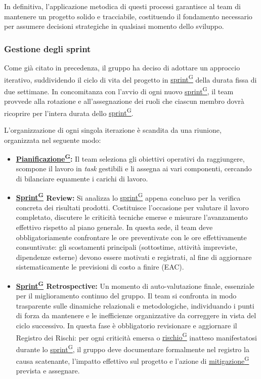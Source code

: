 \documentclass[a4paper,12pt]{article}
\providecommand{\glslink}[2]{\href{https://alittlebyte-19.github.io/Documentazione/glossario.html\#gls-#1}{\underline{#2}\textsuperscript{\scriptsize G}}}
\begin{document}
In definitiva, l'applicazione metodica di questi processi garantisce al team di mantenere un progetto solido e tracciabile, costituendo il fondamento necessario per assumere decisioni strategiche in qualsiasi momento dello sviluppo.

\subsubsection{Gestione degli sprint}

Come già citato in precedenza, il gruppo ha deciso di adottare un approccio iterativo, suddividendo il ciclo di vita del progetto in \glslink{sprint}{sprint} della durata fissa di due settimane. In concomitanza con l'avvio di ogni nuovo \glslink{sprint}{sprint}, il team provvede alla rotazione e all'assegnazione dei ruoli che ciascun membro dovrà ricoprire per l'intera durata dello \glslink{sprint}{sprint}.

L'organizzazione di ogni singola iterazione è scandita da una riunione, organizzata nel seguente modo:

\begin{itemize}
    \item \textbf{\glslink{pianificazione}{Pianificazione}:} Il team seleziona gli obiettivi operativi da raggiungere, scompone il lavoro in \textit{task} gestibili e li assegna ai vari componenti, cercando di bilanciare equamente i carichi di lavoro.
    \item \textbf{\glslink{sprint}{Sprint} Review:} Si analizza lo \glslink{sprint}{sprint} appena concluso per la verifica concreta dei risultati prodotti. Costituisce l'occasione per valutare il lavoro completato, discutere le criticità tecniche emerse e misurare l'avanzamento effettivo rispetto al piano generale. In questa sede, il team deve obbligatoriamente confrontare le ore preventivate con le ore effettivamente consuntivate: gli scostamenti principali (sottostime, attività impreviste, dipendenze esterne) devono essere motivati e registrati, al fine di aggiornare sistematicamente le previsioni di costo a finire (EAC).
    \item \textbf{\glslink{sprint}{Sprint} Retrospective:} Un momento di auto-valutazione finale, essenziale per il miglioramento continuo del gruppo. Il team si confronta in modo trasparente sulle dinamiche relazionali e metodologiche, individuando i punti di forza da mantenere e le inefficienze organizzative da correggere in vista del ciclo successivo. In questa fase è obbligatorio revisionare e aggiornare il Registro dei Rischi: per ogni criticità emersa o \glslink{rischio}{rischio} inatteso manifestatosi durante lo \glslink{sprint}{sprint}, il gruppo deve documentare formalmente nel registro la causa scatenante, l'impatto effettivo sul progetto e l'azione di \glslink{mitigazione-dei-rischi}{mitigazione} prevista e assegnare. 
\end{itemize}
\end{document}
